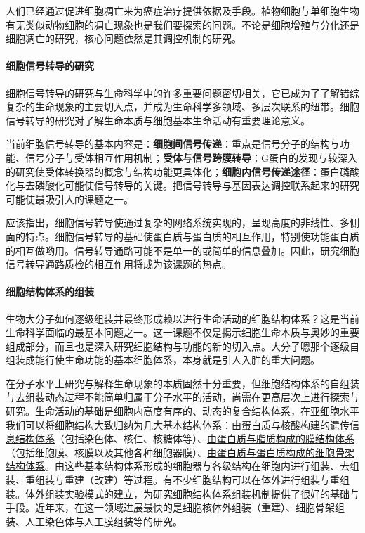 人们已经通过促进细胞凋亡来为癌症治疗提供依据及手段。植物细胞与单细胞生物有无类似动物细胞的凋亡现象也是我们要探索的问题。不论是细胞增殖与分化还是细胞凋亡的研究，核心问题依然是其调控机制的研究。

\paragraph{细胞信号转导的研究}
细胞信号转导的研究与生命科学中的许多重要问题密切相关，它已成为了了解错综复杂的生命现象的主要切入点，并成为生命科学多领域、多层次联系的纽带。细胞信号转导的研究对了解生命本质与细胞基本生命活动有重要理论意义。

当前细胞信号转导的基本内容是：\textbf{细胞间信号传递}：重点是信号分子的结构与功能、信号分子与受体相互作用机制；\textbf{受体与信号跨膜转导}：G蛋白的发现与较深入的研究使受体转换器的概念与结构功能更具体化；\textbf{细胞内信号传递途径}：蛋白磷酸化与去磷酸化可能使信号转导的关键。把信号转导与基因表达调控联系起来的研究可能使最吸引人的课题之一。

应该指出，细胞信号转导使通过复杂的网络系统实现的，呈现高度的非线性、多侧面的特点。细胞信号转导的基础使蛋白质与蛋白质的相互作用，特别使功能蛋白质的相互做哟用。信号转导通路可能不是单一的或简单的信息叠加。因此，研究细胞信号转导通路质检的相互作用将成为该课题的热点。

\paragraph{细胞结构体系的组装}

生物大分子如何逐级组装并最终形成赖以进行生命活动的细胞结构体系？这是当前生命科学面临的最基本问题之一。这一课题不仅是揭示细胞生命本质与奥妙的重要组成部分，而且也是深入研究细胞结构与功能的新的切入点。大分子嗯那个逐级自组装成能行使生命功能的基本细胞体系，本身就是引人入胜的重大问题。

在分子水平上研究与解释生命现象的本质固然十分重要，但细胞结构体系的自组装与去组装动态过程不能简单归属于分子水平的活动，尚需在更高层次上进行探索与研究。生命活动的基础是细胞内高度有序的、动态的复合结构体系，在亚细胞水平我们可以将细胞结构大致归纳为几大基本结构体系：\underline{由蛋白质与核酸构建的遗传信息结构体系}（包括染色体、核仁、核糖体等）、\underline{由蛋白质与脂质构成的膜结构体系}（包括细胞膜、核膜以及其他各种细胞器膜）、\underline{由蛋白质与蛋白质构成的细胞骨架结构体系}。由这些基本结构体系形成的细胞器与各级结构在细胞内进行组装、去组装、重组装与重建（改建）等过程。有不少细胞结构可以在体外进行组装与重组装。体外组装实验模式的建立，为研究细胞结构体系组装机制提供了很好的基础与手段。近年来，在这一领域进展最快的是细胞核体外组装（重建）、细胞骨架组装、人工染色体与人工膜组装等的研究。\\


